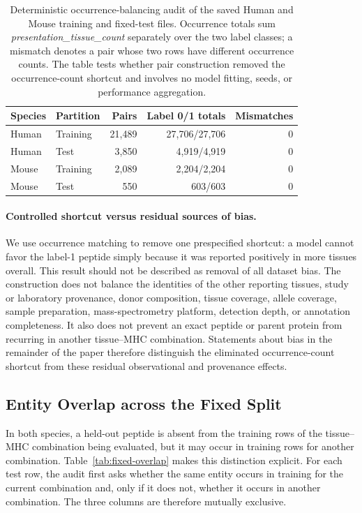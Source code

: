 \begin{table}[tbp]
\centering
\caption{Deterministic occurrence-balancing audit of the saved Human and Mouse training and fixed-test files. Occurrence totals sum \mbox{\textit{presentation\_tissue\_count}} separately over the two label classes; a mismatch denotes a pair whose two rows have different occurrence counts. The table tests whether pair construction removed the occurrence-count shortcut and involves no model fitting, seeds, or performance aggregation.}
\label{tab:occurrence-balance-audit}
\small
\begin{tabularx}{\columnwidth}{@{}llrrr@{}}
\toprule
Species & Partition & Pairs & Label 0/1 totals & Mismatches \\
\midrule
Human & Training & 21,489 & 27,706/27,706 & 0 \\
Human & Test & 3,850 & 4,919/4,919 & 0 \\
Mouse & Training & 2,089 & 2,204/2,204 & 0 \\
Mouse & Test & 550 & 603/603 & 0 \\
\bottomrule
\end{tabularx}
\end{table}

\paragraph{Controlled shortcut versus residual sources of bias.}
We use occurrence matching to remove one prespecified shortcut: a model cannot favor the label-1 peptide simply because it was reported positively in more tissues overall. This result should not be described as removal of all dataset bias. The construction does not balance the identities of the other reporting tissues, study or laboratory provenance, donor composition, tissue coverage, allele coverage, sample preparation, mass-spectrometry platform, detection depth, or annotation completeness. It also does not prevent an exact peptide or parent protein from recurring in another tissue--MHC combination. Statements about bias in the remainder of the paper therefore distinguish the eliminated occurrence-count shortcut from these residual observational and provenance effects.

\subsection{Entity Overlap across the Fixed Split}

In both species, a held-out peptide is absent from the training rows of the tissue--MHC combination being evaluated, but it may occur in training rows for another combination. Table~\ref{tab:fixed-overlap} makes this distinction explicit. For each test row, the audit first asks whether the same entity occurs in training for the current combination and, only if it does not, whether it occurs in another combination. The three columns are therefore mutually exclusive.

